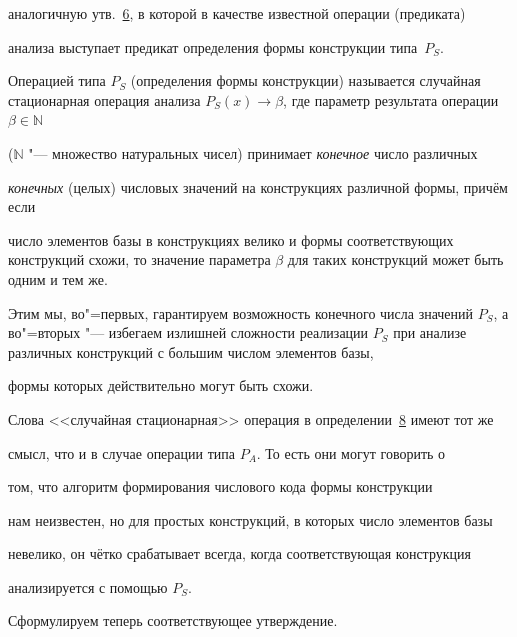 аналогичную утв.~\hyperlink{kr:utv6}{6}, в которой в качестве известной операции (предиката)

анализа выступает предикат определения формы конструкции типа~$P_{S}$.





\smallskip



\hypertarget{kr:def8}{}



\begin{definition}[8]Операцией типа $P_{S}$ (определения формы конструкции) называется случайная стационарная операция анализа $P_{S}(x)\to \beta $, где параметр результата операции $\beta \in \mathbb{N}$

($\mathbb{N}$ "--- множество натуральных чисел) принимает {\sl конечное} число различных

{\sl конечных} (целых) числовых значений на конструкциях различной формы, причём если

число элементов базы в конструкциях велико и формы соответствующих конструкций схожи, то значение параметра $\beta $ для таких конструкций может быть одним и тем же. 

Этим мы, во"=первых, гарантируем возможность конечного числа значений $P_{S}$, а во"=вторых "--- избегаем излишней сложности реализации $P_{S}$ при анализе различных конструкций с большим числом элементов базы,

формы которых действительно могут быть схожи.

\end{definition}



\smallskip



Слова <<случайная стационарная>> операция в определении~\hyperlink{kr:def8}{8} имеют тот же

смысл, что и в случае операции типа $P_{A}$. То есть они могут говорить о

том, что алгоритм формирования числового кода формы конструкции

нам неизвестен, но для простых конструкций, в которых число элементов базы

невелико, он чётко срабатывает всегда, когда соответствующая конструкция

анализируется с помощью $P_{S}$.



Сформулируем теперь соответствующее утверждение.




